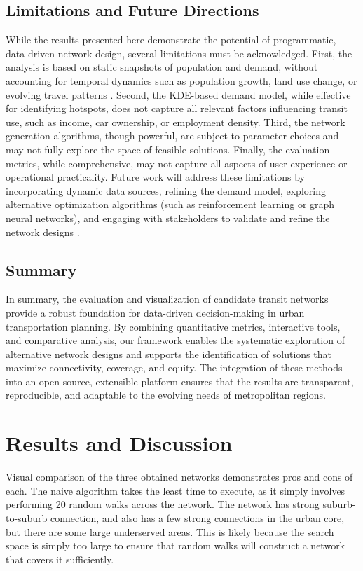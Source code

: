 \documentclass[manuscript]{acmart}
\begin{document}
\subsection{Limitations and Future Directions}
While the results presented here demonstrate the potential of programmatic, data-driven network design, several limitations must be acknowledged. First, the analysis is based on static snapshots of population and demand, without accounting for temporal dynamics such as population growth, land use change, or evolving travel patterns \cite{bib:overview-field}. Second, the KDE-based demand model, while effective for identifying hotspots, does not capture all relevant factors influencing transit use, such as income, car ownership, or employment density. Third, the network generation algorithms, though powerful, are subject to parameter choices and may not fully explore the space of feasible solutions. Finally, the evaluation metrics, while comprehensive, may not capture all aspects of user experience or operational practicality. Future work will address these limitations by incorporating dynamic data sources, refining the demand model, exploring alternative optimization algorithms (such as reinforcement learning or graph neural networks), and engaging with stakeholders to validate and refine the network designs \cite{bib:camporeale2016equity}.

\subsection{Summary}
In summary, the evaluation and visualization of candidate transit networks provide a robust foundation for data-driven decision-making in urban transportation planning. By combining quantitative metrics, interactive tools, and comparative analysis, our framework enables the systematic exploration of alternative network designs and supports the identification of solutions that maximize connectivity, coverage, and equity. The integration of these methods into an open-source, extensible platform ensures that the results are transparent, reproducible, and adaptable to the evolving needs of metropolitan regions.

\section{Results and Discussion}

Visual comparison of the three obtained networks demonstrates pros and cons of each. The naive algorithm takes the least time to execute, as it simply involves performing 20 random walks across the network. The network has strong suburb-to-suburb connection, and also has a few strong connections in the urban core, but there are some large underserved areas. This is likely because the search space is simply too large to ensure that random walks will construct a network that covers it sufficiently.
\end{document}
